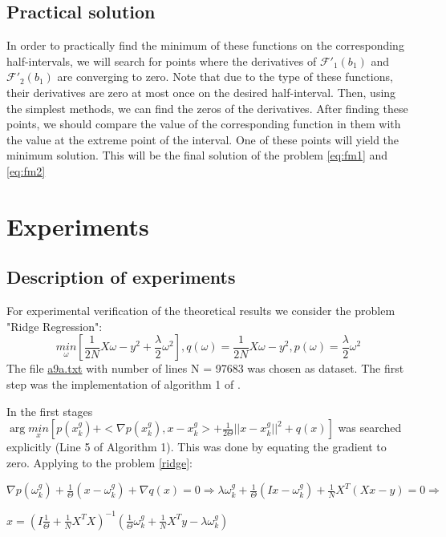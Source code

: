 \documentclass{article}
\begin{document}
\subsection{Practical solution}\label{eq:3.5}
In order to practically find the minimum of these functions on the corresponding half-intervals, we will search for points where the derivatives of $\mathcal{F'}_1(b_1)$ and $\mathcal{F'}_2(b_1)$ are converging to zero. Note that due to the type of these functions, their derivatives are zero at most once on the desired half-interval. Then, using the simplest methods, we can find the zeros of the derivatives. After finding these points, we should compare the value of the corresponding function in them with the value at the extreme point of the interval. One of these points will yield the minimum solution. This will be the final solution of the problem \ref{eq:fm1} and \ref{eq:fm2}

\section{Experiments}

\subsection{Description of experiments}
For experimental verification of the theoretical results we consider the problem "Ridge Regression": 
\begin{equation}
    \label{ridge}
    \underset{\omega}{min}[ \frac{1}{2N} X\omega - y^2 + \frac{\lambda}{2}\omega^2], q(\omega) = \frac{1}{2N} X\omega - y^2, p(\omega) = \frac{\lambda}{2}\omega^2
\end{equation}
The file \href{https://www.csie.ntu.edu.tw/~cjlin/libsvmtools/datasets/binary.html#a1a}{a9a.txt} with number of lines N = 97683 was chosen as dataset. The first step was the implementation of algorithm 1 of \cite{kovalev2022optimal}. 

In the first stages $\arg\underset{x}{min} [p(x_k^g) + <\nabla p(x_k^g), x - x_k^g> + \frac{1}{2\Theta}||x - x_k^g||^2 + q(x)]$ was searched explicitly (Line 5 of Algorithm 1). This was done by equating the gradient to zero. Applying to the problem \ref{ridge}: 
\begin{center}
$\nabla p(\omega_k^g) + \frac{1}{\Theta}(x - \omega_k^g) + \nabla q(x) = 0 \Rightarrow \lambda \omega_k^g + \frac{1}{\Theta}(Ix - \omega_k^g) + \frac{1}{N}X^T(Xx - y) = 0 \Rightarrow$

    
$ x = (I \frac{1}{\Theta} + \frac{1}{N}X^TX)^{-1}(\frac{1}{\Theta} \omega_k^g + \frac{1}{N}X^Ty - \lambda \omega_k^g) $
\end{center}
\end{document}
